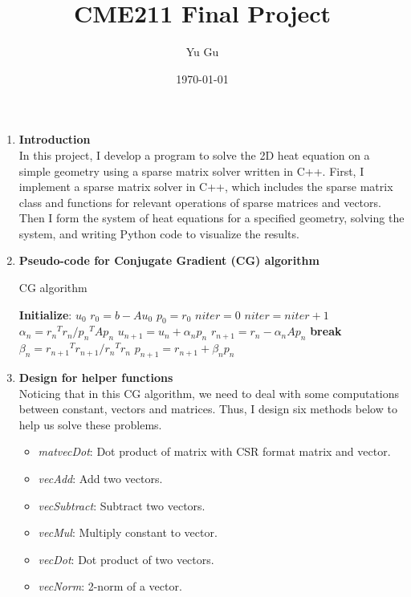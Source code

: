 \documentclass{article}
\title{CME211 Final Project}
\author{Yu Gu}
\date{\today}
\begin{document}
\maketitle


\begin{enumerate}
\item \textbf{Introduction}\\
In this project, I develop a program to solve the 2D heat equation on a simple geometry using a sparse matrix solver written in C++. First, I implement a sparse matrix solver in C++, which includes the sparse matrix class and functions for relevant operations of sparse matrices and vectors. Then I form the system of heat equations for a specified geometry, solving the system, and writing Python code to visualize the results.\\


\item \textbf{Pseudo-code for Conjugate Gradient (CG) algorithm}
\begin{algorithm}
\caption{CG algorithm} 
\begin{algorithmic}
    \STATE \textbf{Initialize}: $u_0$
    \STATE $r_0=b-Au_0$
    \STATE $p_0=r_0$
    \STATE $niter=0$
        \STATE $niter=niter + 1$
        \STATE $\alpha_n={r_n}^Tr_n/{p_n}^TAp_n$
        \STATE $u_{n+1}=u_n+\alpha_np_n$
        \STATE $r_{n+1}=r_n-\alpha_nAp_n$
            \STATE \textbf{break}
        \ENDIF
        \STATE $\beta_n={r_{n+1}}^Tr_{n+1}/{r_n}^Tr_n$
        \STATE $p_{n+1}=r_{n+1}+\beta_np_n$
    \ENDWHILE
\end{algorithmic}
\end{algorithm}


\item \textbf{Design for helper functions}\\
Noticing that in this CG algorithm, we need to deal with some computations between constant, vectors and matrices. Thus, I design six methods below to help us solve these problems.
\begin{itemize}
\item{\emph{matvecDot}:} Dot product of matrix with CSR format matrix and vector.
\item{\emph{vecAdd}:} Add two vectors.
\item{\emph{vecSubtract}:} Subtract two vectors.
\item{\emph{vecMul}:} Multiply constant to vector.
\item{\emph{vecDot}:} Dot product of two vectors.
\item{\emph{vecNorm}:} 2-norm of a vector.\\
\end{itemize}


\end{enumerate}
\end{document}
